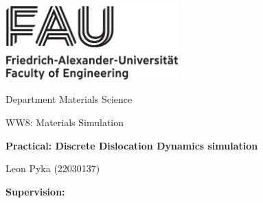




%
\begin{titlepage}
\begin{center}
\includegraphics[width=0.5\textwidth]{graphics/FAU_TechFak_EN_H_black.eps}

\LARGE Department Materials Science

\Large WW8: Materials Simulation

\LARGE \textbf{Practical: Discrete Dislocation Dynamics simulation}



\vfil
\Large Leon Pyka (22030137)



\Large \textbf{Supervision: }
\end{center}

\thispagestyle{empty}
%
\end{titlepage}
%

\setcounter{page}{1}

\tableofcontents

\printbibliography


